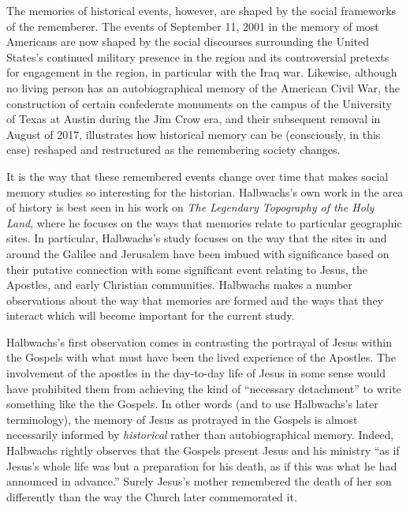 The memories of historical events, however, are shaped by the social
frameworks of the rememberer. The events of September 11, 2001 in the
memory of most Americans are now shaped by the social discourses
surrounding the United States's continued military presence in the
region and its controversial pretexts for engagement in the region, in
particular with the Iraq war. Likewise, although no living person has an
autobiographical memory of the American Civil War, the construction of
certain confederate monuments on the campus of the University of Texas
at Austin during the Jim Crow era, and their subsequent removal in
August of 2017, illustrates how historical memory can be (consciously,
in this case) reshaped and restructured as the remembering society
changes.

It is the way that these remembered events change over time that makes
social memory studies so interesting for the historian. Halbwachs's own
work in the area of history is best seen in his work on \emph{The
Legendary Topography of the Holy Land}, where he focuses on the ways
that memories relate to particular geographic sites. In particular,
Halbwachs's study focuses on the way that the sites in and around the
Galilee and Jerusalem have been imbued with significance based on their
putative connection with some significant event relating to Jesus, the
Apostles, and early Christian communities. Halbwachs makes a number
observations about the way that memories are formed and the ways that
they interact which will become important for the current study.

Halbwachs's first observation comes in contrasting the portrayal of
Jesus within the Gospels with what must have been the lived experience
of the Apostles.\autocite[193--198]{halbwachs1992} The involvement of
the apostles in the day-to-day life of Jesus in some sense would have
prohibited them from achieving the kind of ``necessary detachment'' to
write something like the the Gospels. In other words (and to use
Halbwachs's later terminology), the memory of Jesus as protrayed in the
Gospels is almost necessarily informed by \emph{historical} rather than
autobiographical memory.\autocite[194]{halbwachs1992} Indeed, Halbwachs
rightly observes that the Gospels present Jesus and his ministry ``as if
Jesus's whole life was but a preparation for his death, as if this was
what he had announced in advance.''\autocite[198]{halbwachs1992} Surely
Jesus's mother remembered the death of her son differently than the way
the Church later commemorated it.\autocites[Regardless of whether
Halbwachs's conception of Early Christianity would be considered sound
today, the idea that the Gospels represent several collective
remembrances of Jesus's life, ministry and death each bearing marks from
their own \emph{Sitz im Leben} (to borrow from the form critics) seems
relatively uncontroversial. A number of studies on the Jesus and early
Christian memory have come about in the past several years.
See][]{ledonne2009}{rodriguez2010}[For an overview of the modern impact
of Halbwachs (and memory studies more generally) on the field of
Historical Jesus studies, see][]{keith_ec2015}[and][]{keith_ec2015b}

